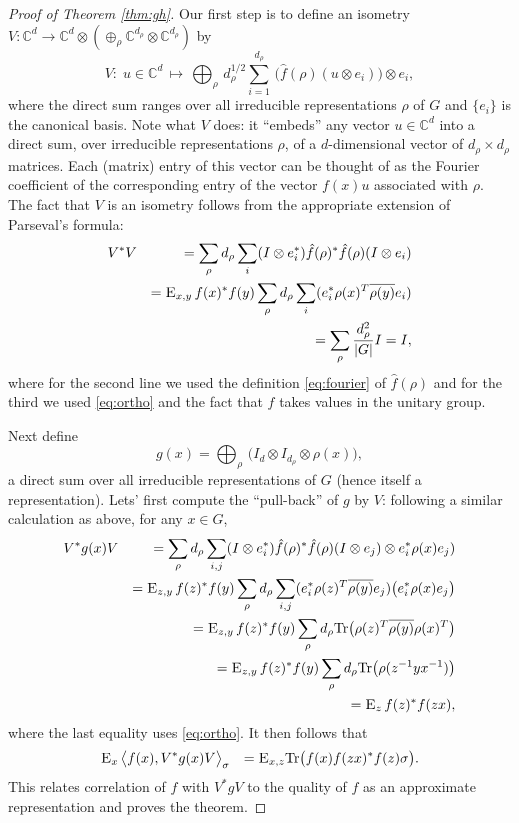 \documentclass{report}
\theoremstyle{plain}
\theoremstyle{definition}
\theoremstyle{remark}
\newcommand{\Es}[1]{\textsc{E}_{#1}}
\newcommand{\C}{\ensuremath{\mathbb{C}}}
\numberwithin{equation}{subsection}
\begin{document}
\begin{proof}[Proof of Theorem \ref{thm:gh}]
Our first step is to define an isometry $V:\C^d \to \C^d \otimes (\oplus_\rho \C^{d_\rho} \otimes \C^{d_\rho})$ by
$$ V :\;u \in \C^d \,\mapsto\, \bigoplus_\rho \,d_\rho^{1/2} \sum_{i=1}^{d_\rho} \,\big(\hat{f}(\rho) (u\otimes e_i)\big) \otimes e_i,$$
where the direct sum ranges over all irreducible representations $\rho$ of $G$ and $\{e_i\}$ is the canonical basis. 
Note what $V$ does: it ``embeds'' any vector $u\in \C^d$ into a direct sum, over irreducible representations $\rho$, of a $d$-dimensional vector of $d_\rho\times d_\rho$ matrices. Each (matrix) entry of this vector can be thought of as the Fourier coefficient of the corresponding entry of the vector $f(x)u$ associated with $\rho$. 
The fact that $V$ is an isometry follows from the appropriate extension of Parseval's formula:  
\begin{eqnarray*}
& V^* V &= \sum_\rho d_\rho \sum_i (I\otimes e_i^*) \hat{f}(\rho)^*\hat{f}(\rho) (I\otimes e_i)\\
&&= \Es{x,y}\,  f(x)^*f(y) \sum_\rho d_\rho \sum_i  (e_i^* \rho(x)^T \overline{\rho(y)} e_i)\\
&&= \sum_\rho \frac{d_\rho^2}{|G|}I = I,
\end{eqnarray*}
where for the second line we used the definition \eqref{eq:fourier} of $\hat{f}(\rho)$ and  for the third we used \eqref{eq:ortho} and the fact that $f$ takes values in the unitary group.

Next define
$$g(x) = \bigoplus_\rho \,\big(I_d \otimes I_{d_\rho} \otimes \rho(x)\big), $$
a direct sum over all irreducible representations of $G$ (hence itself a representation). Lets' first compute the ``pull-back'' of $g$ by $V$: following a similar calculation as above, for any $x\in G$, 
\begin{eqnarray*}
& V^*g(x) V  &=  \sum_{\rho}  d_\rho \sum_{i,j} (I\otimes e_i^*)\hat{f}(\rho)^* \hat{f}(\rho)(I\otimes e_j) \otimes e_i^* \rho(x) e_j ) \\
&& =  \Es{z,y}\,  f(z)^*f(y)  \sum_{\rho}  d_\rho \sum_{i,j} (e_i^* \rho(z)^T \overline{\rho(y)} e_j) \big( e_i^* \rho(x) e_j \big) \\
&& =  \Es{z,y}\,  f(z)^*f(y)  \sum_{\rho}  d_\rho \mathrm{Tr}\big( \rho(z)^T \overline{\rho(y)}  {\rho(x)^T} \big) \\
&& =  \Es{z,y}\,  f(z)^*f(y)  \sum_{\rho}  d_\rho \mathrm{Tr}\big( \rho(z^{-1}y x^{-1}) \big) \\
&& =  \Es{z}\,  f(z)^*f(zx) , 
\end{eqnarray*}
where the last equality uses \eqref{eq:ortho}.
It then follows that 
\begin{eqnarray*}
&\Es{x}\, \big\langle f(x), V^*g(x) V \big\rangle_\sigma &=  \Es{x,z} \mathrm{Tr}\big( f(x) f(zx)^* f(z)\sigma\big).
\end{eqnarray*}  
This relates correlation of $f$ with $V^*gV$ to the quality of $f$ as an approximate representation and proves the theorem. 
\end{proof}
\end{document}
